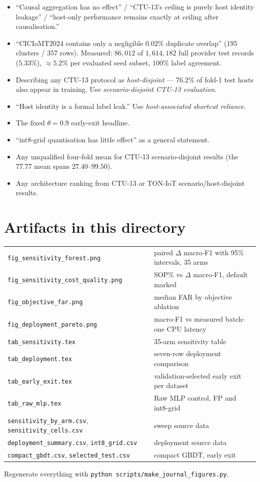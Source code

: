 \begin{itemize}
  \item ``Causal aggregation has no effect'' / ``CTU-13's ceiling is purely host
        identity leakage'' / ``host-only performance remains exactly at ceiling after
        causalisation.''
  \item ``CICIoMT2024 contains only a negligible $0.02\%$ duplicate overlap''
        (195 clusters / 357 rows). Measured: $86{,}012$ of $1{,}614{,}182$ full
        provider test records ($5.33\%$), $\approx5.2\%$ per evaluated seed subset,
        $100\%$ label agreement.
  \item Describing any CTU-13 protocol as \emph{host-disjoint} --- $76.2\%$ of fold-1
        test hosts also appear in training. Use \emph{scenario-disjoint CTU-13
        evaluation}.
  \item ``Host identity is a formal label leak.'' Use \emph{host-associated shortcut
        reliance}.
  \item The fixed $\theta=0.9$ early-exit headline.
  \item ``int8-grid quantisation has little effect'' as a general statement.
  \item Any unqualified four-fold mean for CTU-13 scenario-disjoint results (the
        $77.77$ mean spans $27.40$--$99.50$).
  \item Any architecture ranking from CTU-13 or TON-IoT scenario/host-disjoint
        results.
\end{itemize}

\section*{Artifacts in this directory}

\begin{tabular}{ll}
\texttt{fig\_sensitivity\_forest.png} & paired $\Delta$ macro-F1 with 95\% intervals,
35 arms \\
\texttt{fig\_sensitivity\_cost\_quality.png} & SOP\% vs $\Delta$ macro-F1, default
marked \\
\texttt{fig\_objective\_far.png} & median FAR by objective ablation \\
\texttt{fig\_deployment\_pareto.png} & macro-F1 vs measured batch-one CPU latency \\
\texttt{tab\_sensitivity.tex} & 35-arm sensitivity table \\
\texttt{tab\_deployment.tex} & seven-row deployment comparison \\
\texttt{tab\_early\_exit.tex} & validation-selected early exit per dataset \\
\texttt{tab\_raw\_mlp.tex} & Raw MLP control, FP and int8-grid \\
\texttt{sensitivity\_by\_arm.csv}, \texttt{sensitivity\_cells.csv} & sweep source data \\
\texttt{deployment\_summary.csv}, \texttt{int8\_grid.csv} & deployment source data \\
\texttt{compact\_gbdt.csv}, \texttt{selected\_test.csv} & compact GBDT, early exit \\
\end{tabular}

\bigskip
\noindent Regenerate everything with
\texttt{python scripts/make\_journal\_figures.py}.
